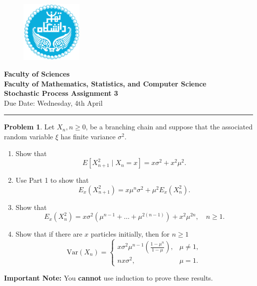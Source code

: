 \documentclass[12pt]{extreport}
\theoremstyle{definition}
\newtheorem{prob}{Problem}
\begin{document}
	\begin{figure}
		\centering \includegraphics[height=3cm]{Logo.png}
	\end{figure}
    \vspace{-10mm}
	\begin{center}
	\textbf{Faculty of Sciences}
		\\
	\textbf{Faculty of Mathematics, Statistics, and Computer Science}
		\\
	\textbf{\Large Stochastic Process Assignment 3}\\
	Due Date: Wednesday, 4th April
	\par\noindent\rule{\textwidth}{0.4pt}
	\end{center}
	
	\begin{prob}
        \noindent Let $X_n, n \geq 0$, be a branching chain and suppose that the associated random variable $\xi$ has finite variance $\sigma^2$. 
        
        \begin{enumerate}
            \item Show that
            \[
            E[X_{n+1}^2 \mid X_n = x] = x\sigma^2 + x^2\mu^2.
            \]
            
            \item Use Part 1 to show that
            \[
            E_x(X_{n+1}^2) = x\mu^n\sigma^2 + \mu^2 E_x(X_n^2).
            \]
            
            \item Show that
            \[
            E_x(X_n^2) = x\sigma^2(\mu^{n-1} + \dots + \mu^{2(n-1)}) + x^2\mu^{2n}, \quad n \geq 1.
            \]
            
            \item Show that if there are $x$ particles initially, then for $n \geq 1$
            \[
            \text{Var} (X_n) =
            \begin{cases}
            x\sigma^2 \mu^{n-1} \left(\frac{1 - \mu^n}{1 - \mu}\right), & \mu \neq 1, \\
            n x \sigma^2, & \mu = 1.
            \end{cases}
            \]
        \end{enumerate}
        \noindent \textbf{Important Note:} You \textbf{cannot} use induction to prove these results.
	\end{prob}
	
\end{document}

